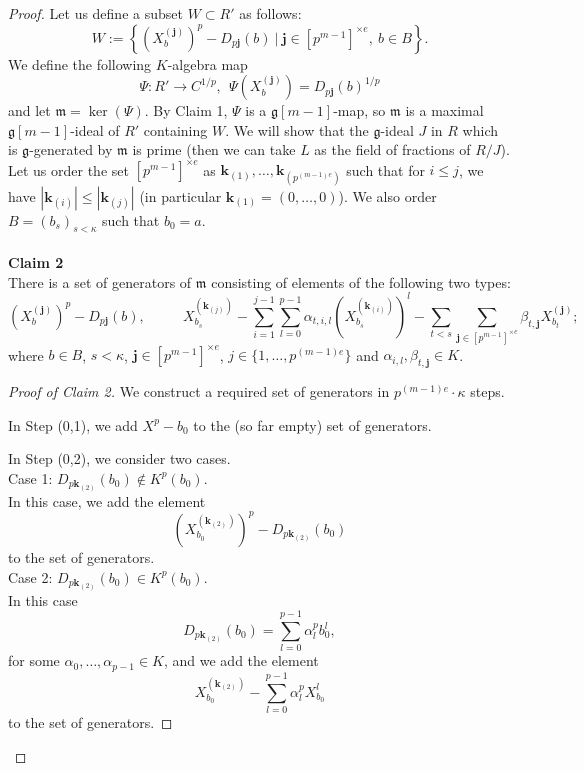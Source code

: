 \documentclass[10pt]{amsart}
\theoremstyle{definition}
\begin{document}
\begin{proof}
Let us define a subset $W\subset R'$ as follows:
$$W:=\left\{\left(X_b^{(\mathbf{j})}\right)^p-D_{p\mathbf{j}}(b)\ |\ \mathbf{j}\in [p^{m-1}]^{\times e},\ b\in B\right\}.$$
We define the following $K$-algebra map
$$\Psi:R'\to C^{1/p},\ \ \Psi\left(X_b^{(\mathbf{j})}\right)=D_{p\mathbf{j}}(b)^{1/p}$$
and let $\mathfrak{m}=\ker(\Psi)$.
By Claim 1, $\Psi$ is a $\mathfrak{g}[m-1]$-map, so $\mathfrak{m}$ is a maximal $\mathfrak{g}[m-1]$-ideal of $R'$ containing $W$. We will show that the $\mathfrak{g}$-ideal $J$ in $R$ which is $\mathfrak{g}$-generated by $\mathfrak{m}$ is prime (then we can take $L$ as the field of fractions of $R/J$). Let us order the set $[p^{m-1}]^{\times e}$ as $\mathbf{k}_{(1)},\ldots,\mathbf{k}_{(p^{(m-1)e})}$ such that for $i\leqslant j$, we have $|\mathbf{k}_{(i)}|\leqslant |\mathbf{k}_{(j)}|$ (in particular $\mathbf{k}_{(1)}=(0,\ldots,0)$). We also order $B=(b_s)_{s<\kappa}$ such that $b_0=a$.
\\
\\
{\bf Claim 2}
\\
There is a set of generators of $\mathfrak{m}$ consisting of elements of the following two types:
$$\left(X_b^{(\mathbf{j})}\right)^p-D_{p\mathbf{j}}(b),\ \ \ \ \ \ \ \ \ \ \ \ X_{b_s}^{(\mathbf{k}_{(j)})} - \sum_{i=1}^{j-1}\sum _{l=0}^{p-1}\alpha_{t,i,l}\left(X_{b_s}^{(\mathbf{k}_{(i)})}\right)^l - \sum_{t<s}\sum_{\mathbf{j}\in [p^{m-1}]^{\times e}}\beta_{t,\mathbf{j}}X_{b_t}^{(\mathbf{j})};$$
where $b\in B$, $s<\kappa$, $\mathbf{j}\in [p^{m-1}]^{\times e}$, $j\in \{1,\ldots,p^{(m-1)e}\}$ and $\alpha_{i,l},\beta_{t,\mathbf{j}}\in K$.
\begin{proof}[Proof of Claim 2]
We construct a required set of generators in $p^{(m-1)e}\cdot \kappa$ steps.

In Step (0,1), we add $X^p-b_0$ to the (so far empty) set of generators.

In Step (0,2), we consider two cases.
\\
Case 1: $D_{p\mathbf{k}_{(2)}}(b_0)\notin K^p(b_0)$.
\\
In this case, we add the element
$$\left(X_{b_0}^{(\mathbf{k}_{(2)})}\right)^p-D_{p\mathbf{k}_{(2)}}(b_0)$$
to the set of generators.
\\
Case 2: $D_{p\mathbf{k}_{(2)}}(b_0)\in K^p(b_0)$.
\\
In this case
$$D_{p\mathbf{k}_{(2)}}(b_0)=\sum_{l=0}^{p-1}\alpha_l^pb_0^l,$$
for some $\alpha_0,\ldots,\alpha_{p-1}\in K$, and we add the element
$$X_{b_0}^{(\mathbf{k}_{(2)})}-\sum_{l=0}^{p-1}\alpha_l^pX_{b_0}^l$$
to the set of generators.


\end{proof}
\end{proof}
\end{document}
